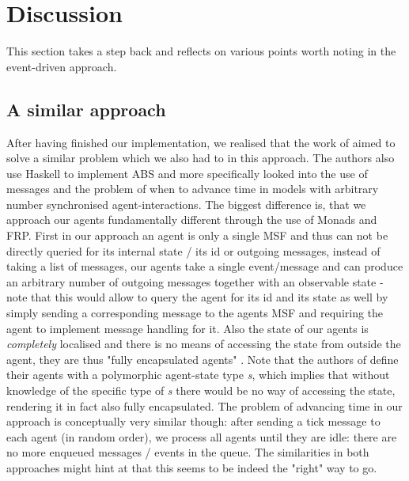 \section{Discussion}
This section takes a step back and reflects on various points worth noting in the event-driven approach.

\subsection{A similar approach}
After having finished our implementation, we realised that the work of \cite{botta_time_2010} aimed to solve a similar problem which we also had to in this approach. The authors also use Haskell to implement ABS and more specifically looked into the use of messages and the problem of when to advance time in models with arbitrary number synchronised agent-interactions.
The biggest difference is, that we approach our agents fundamentally different through the use of Monads and FRP. First in our approach an agent is only a single MSF and thus can not be directly queried for its internal state / its id or outgoing messages, instead of taking a list of messages, our agents take a single event/message and can produce an arbitrary number of outgoing messages together with an observable state - note that this would allow to query the agent for its id and its state as well by simply sending a corresponding message to the agents MSF and requiring the agent to implement message handling for it. Also the state of our agents is \textit{completely} localised and there is no means of accessing the state from outside the agent, they are thus "fully encapsulated agents" \cite{botta_time_2010}. Note that the authors of \cite{botta_time_2010} define their agents with a polymorphic agent-state type \textit{s}, which implies that without knowledge of the specific type of \textit{s} there would be no way of accessing the state, rendering it in fact also fully encapsulated.
The problem of advancing time in our approach is conceptually very similar though: after sending a tick message to each agent (in random order), we process all agents until they are idle: there are no more enqueued messages / events in the queue. The similarities in both approaches might hint at that this seems to be indeed the "right" way to go. %

